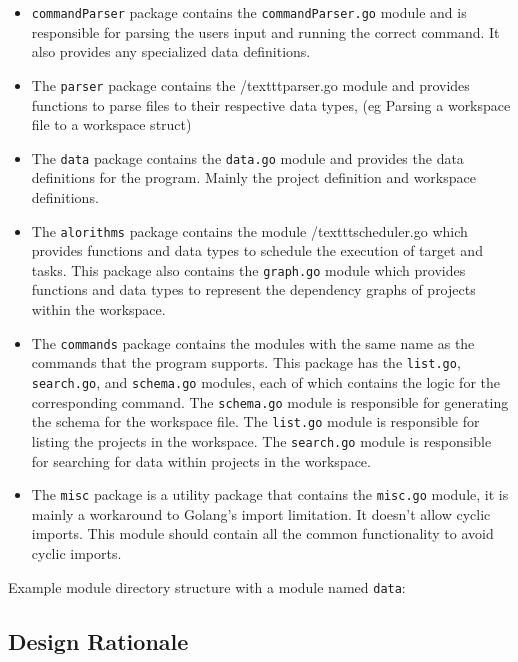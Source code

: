 \documentclass[11pt]{article}
\begin{document}
\begin{itemize}
\item \texttt{commandParser} package contains the \texttt{commandParser.go} module and is responsible for parsing the users input and
running the correct command. It also provides any specialized data definitions.

\item The \texttt{parser} package contains the /texttt{parser.go} module and provides functions to parse files to their
respective data types, (eg Parsing a workspace file to a workspace struct)

\item The \texttt{data} package contains the \texttt{data.go} module and provides the data definitions for the program. Mainly the
\gls{project definition} and workspace definitions.

\item The \texttt{alorithms} package contains the module /texttt{scheduler.go} which provides functions and data types to schedule the
execution of \gls{target} and tasks. This package also contains the \texttt{graph.go} module which provides functions and data types
to represent the dependency graphs of projects within the workspace.

\item The \texttt{commands} package contains the modules with the same name as the commands that the program supports. This package
has the \texttt{list.go}, \texttt{search.go}, and \texttt{schema.go} modules, each of which contains the logic for the corresponding
command. The \texttt{schema.go} module is responsible for generating the schema for the workspace file. The \texttt{list.go} module
is responsible for listing the projects in the workspace. The \texttt{search.go} module is responsible for searching for data within
projects in the workspace.

\item The \texttt{misc} package is a utility package that contains the \texttt{misc.go} module, it is mainly a workaround to Golang's import
limitation. It doesn't allow cyclic imports. This module should contain all
the common functionality to avoid cyclic imports.
\end{itemize}
Example module directory structure with a module named \texttt{data}:


\subsection{Design Rationale}
\end{document}
